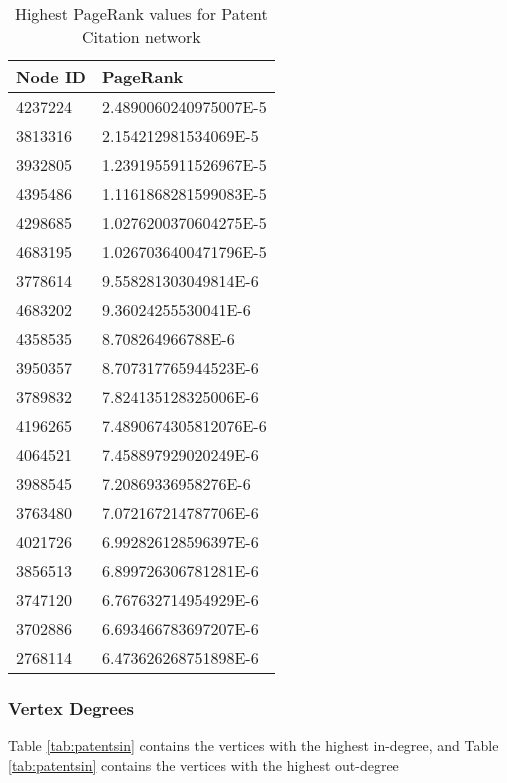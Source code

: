\begin{table}[htbp]%
\centering
\begin{tabular}{|l|l|}
\hline
Node ID & PageRank \\
\hline
4237224 & 2.4890060240975007E-5 \\
3813316 & 2.154212981534069E-5 \\
3932805 & 1.2391955911526967E-5 \\
4395486 & 1.1161868281599083E-5 \\
4298685 & 1.0276200370604275E-5 \\
4683195 & 1.0267036400471796E-5 \\
3778614 & 9.558281303049814E-6 \\
4683202 & 9.36024255530041E-6 \\
4358535 & 8.708264966788E-6 \\
3950357 & 8.707317765944523E-6 \\
3789832 & 7.824135128325006E-6 \\
4196265 & 7.4890674305812076E-6 \\
4064521 & 7.458897929020249E-6 \\
3988545 & 7.20869336958276E-6 \\
3763480 & 7.072167214787706E-6 \\
4021726 & 6.992826128596397E-6 \\
3856513 & 6.899726306781281E-6 \\
3747120 & 6.767632714954929E-6 \\
3702886 & 6.693466783697207E-6 \\
2768114 & 6.473626268751898E-6 \\
\hline
\end{tabular}
\caption{Highest PageRank values for Patent Citation network}
\label{tab:patentspr}
\end{table}

\subsubsection{Vertex Degrees}
Table \ref{tab:patentsin} contains the vertices with the highest in-degree, and Table \ref{tab:patentsin} contains the vertices with the highest out-degree

